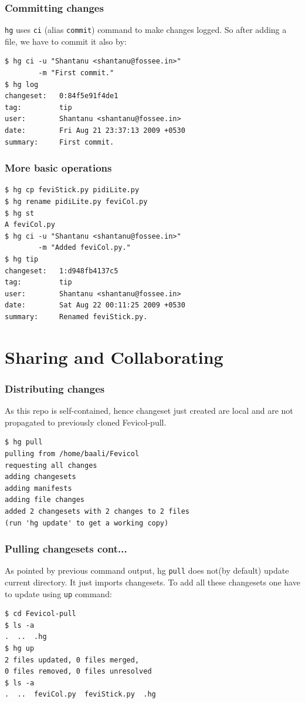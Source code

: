 \documentclass[14pt,compress]{beamer}
\newcounter{time}
\newcommand{\inctime}[1]{\addtocounter{time}{#1}{\tiny \thetime\ m}}
\newcommand{\typ}[1]{\lstinline{#1}}
\begin{document}
\begin{frame}[fragile]
  \frametitle{Committing changes}
  \typ{hg} uses \typ{ci} (alias \typ{commit}) command to make changes logged. So after adding a file, we have to commit it also by:
  \begin{lstlisting}
$ hg ci -u "Shantanu <shantanu@fossee.in>" 
        -m "First commit."
$ hg log
changeset:   0:84f5e91f4de1
tag:         tip
user:        Shantanu <shantanu@fossee.in>
date:        Fri Aug 21 23:37:13 2009 +0530
summary:     First commit.    
  \end{lstlisting}
\end{frame}

\begin{frame}[fragile]
  \frametitle{More basic operations}
  \begin{lstlisting}
$ hg cp feviStick.py pidiLite.py
$ hg rename pidiLite.py feviCol.py
$ hg st
A feviCol.py
$ hg ci -u "Shantanu <shantanu@fossee.in>" 
        -m "Added feviCol.py."
$ hg tip
changeset:   1:d948fb4137c5
tag:         tip
user:        Shantanu <shantanu@fossee.in>
date:        Sat Aug 22 00:11:25 2009 +0530
summary:     Renamed feviStick.py.
  \end{lstlisting}
  \inctime{10}
\end{frame}

\section{Sharing and Collaborating}

\begin{frame}[fragile]
  \frametitle{Distributing changes}
  As this repo is self-contained, hence changeset just created are local and are not propagated to previously cloned Fevicol-pull.
  \begin{lstlisting}
$ hg pull 
pulling from /home/baali/Fevicol
requesting all changes
adding changesets
adding manifests
adding file changes
added 2 changesets with 2 changes to 2 files
(run 'hg update' to get a working copy)
  \end{lstlisting} %
\end{frame}

\begin{frame}[fragile]
  \frametitle{Pulling changesets cont...}
  As pointed by previous command output, hg \typ{pull} does not(by default) update current directory. It just imports changesets. To add all these changesets one have to update using \typ{up} command:
  \begin{lstlisting}
$ cd Fevicol-pull
$ ls -a
.  ..  .hg
$ hg up
2 files updated, 0 files merged, 
0 files removed, 0 files unresolved
$ ls -a
.  ..  feviCol.py  feviStick.py  .hg    
  \end{lstlisting}
\end{frame}
\end{document}
